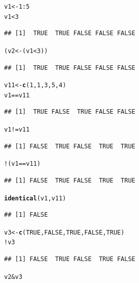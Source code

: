 \documentclass{config/apuntes}\usepackage[]{graphicx}\usepackage[]{xcolor}
\makeatletter
\newcommand{\hlnum}[1]{\textcolor[rgb]{0.686,0.059,0.569}{#1}}%
\newcommand{\hlopt}[1]{\textcolor[rgb]{0,0,0}{#1}}%
\newcommand{\hldef}[1]{\textcolor[rgb]{0.345,0.345,0.345}{#1}}%
\newcommand{\hlkwb}[1]{\textcolor[rgb]{0.69,0.353,0.396}{#1}}%
\newcommand{\hlkwd}[1]{\textcolor[rgb]{0.737,0.353,0.396}{\textbf{#1}}}%
\newenvironment{kframe}{%
 \def\at@end@of@kframe{}%
 \ifinner\ifhmode%
  \def\at@end@of@kframe{\end{minipage}}%
  \begin{minipage}{\columnwidth}%
 \fi\fi%
 \def\FrameCommand##1{\hskip\@totalleftmargin \hskip-\fboxsep
 \colorbox{shadecolor}{##1}\hskip-\fboxsep
     \hskip-\linewidth \hskip-\@totalleftmargin \hskip\columnwidth}%
 \MakeFramed {\advance\hsize-\width
   \@totalleftmargin\z@ \linewidth\hsize
   \@setminipage}}%
 {\par\unskip\endMakeFramed%
 \at@end@of@kframe}
\newenvironment{knitrout}{}{} %
\makeatother
\begin{document}
\begin{knitrout}
\color{fgcolor}\begin{kframe}
\begin{alltt}
\hldef{v1} \hlkwb{<-} \hlnum{1}\hlopt{:}\hlnum{5}
\hldef{v1} \hlopt{<} \hlnum{3}
\end{alltt}
\begin{verbatim}
## [1]  TRUE  TRUE FALSE FALSE FALSE
\end{verbatim}
\begin{alltt}
\hldef{(v2} \hlkwb{<-} \hldef{(v1} \hlopt{<} \hlnum{3}\hldef{))}
\end{alltt}
\begin{verbatim}
## [1]  TRUE  TRUE FALSE FALSE FALSE
\end{verbatim}
\begin{alltt}
\hldef{v11} \hlkwb{<-} \hlkwd{c}\hldef{(}\hlnum{1}\hldef{,} \hlnum{1}\hldef{,} \hlnum{3}\hldef{,} \hlnum{5}\hldef{,} \hlnum{4}\hldef{)}
\hldef{v1} \hlopt{==} \hldef{v11}
\end{alltt}
\begin{verbatim}
## [1]  TRUE FALSE  TRUE FALSE FALSE
\end{verbatim}
\begin{alltt}
\hldef{v1} \hlopt{!=} \hldef{v11}
\end{alltt}
\begin{verbatim}
## [1] FALSE  TRUE FALSE  TRUE  TRUE
\end{verbatim}
\begin{alltt}
\hlopt{!}\hldef{(v1} \hlopt{==} \hldef{v11)}
\end{alltt}
\begin{verbatim}
## [1] FALSE  TRUE FALSE  TRUE  TRUE
\end{verbatim}
\begin{alltt}
\hlkwd{identical}\hldef{(v1, v11)}
\end{alltt}
\begin{verbatim}
## [1] FALSE
\end{verbatim}
\begin{alltt}
\hldef{v3} \hlkwb{<-} \hlkwd{c}\hldef{(}\hlnum{TRUE}\hldef{,} \hlnum{FALSE}\hldef{,} \hlnum{TRUE}\hldef{,} \hlnum{FALSE}\hldef{,} \hlnum{TRUE}\hldef{)}
\hlopt{!}\hldef{v3}
\end{alltt}
\begin{verbatim}
## [1] FALSE  TRUE FALSE  TRUE FALSE
\end{verbatim}
\begin{alltt}
\hldef{v2} \hlopt{&} \hldef{v3}

\end{alltt}
\end{kframe}
\end{knitrout}
\end{document}
